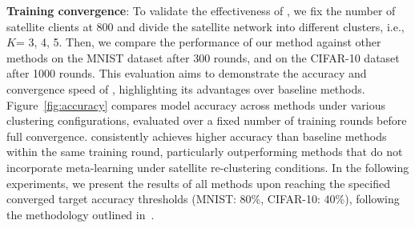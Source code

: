 \textbf{Training convergence}: 
To validate the effectiveness of \algname, we fix the number of satellite clients at 800 and divide the satellite network into different clusters, i.e., $K$= 3, 4, 5. Then, we compare the performance of our method against other methods on the MNIST dataset after 300 rounds, and on the CIFAR-10 dataset after 1000 rounds. This evaluation aims to demonstrate the accuracy and convergence speed of \algname, highlighting its advantages over baseline methods. Figure~\ref{fig:accuracy} compares model accuracy across methods under various clustering configurations, evaluated over a fixed number of training rounds before full convergence. \algname consistently achieves higher accuracy than baseline methods within the same training round, particularly outperforming methods that do not incorporate meta-learning under satellite re-clustering conditions. 
In the following experiments, we present the results of all methods upon reaching the specified converged target accuracy thresholds  (MNIST: 80\%, CIFAR-10: 40\%), following the methodology outlined in~\cite{TMC23}.





